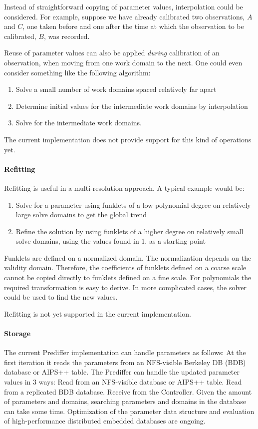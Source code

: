 \documentclass[10pt]{lofar}
\newcommand{\todo}[1]{\begin{center}\fbox{\parbox{0.9\textwidth}{\textbf{!!FIXME!! #1}}}\end{center}}
\begin{document}
Instead of straightforward copying of parameter values, interpolation could be
considered. For example, suppose we have already calibrated two observations,
$A$ and $C$, one taken before and one after the time at which the observation to
be calibrated, $B$, was recorded.

Reuse of parameter values can also be applied \emph{during} calibration of an
observation, when moving from one work domain to the next. One could even
consider something like the following algorithm:
\begin{enumerate}
\item Solve a small number of work domains spaced relatively far apart
\item Determine initial values for the intermediate work domains by
interpolation
\item Solve for the intermediate work domains.
\end{enumerate}

The current implementation does not provide support for this kind of operations
yet.

\paragraph{Refitting}
Refitting is useful in a multi-resolution approach. A typical example would be:
\begin{enumerate}
\item Solve for a parameter using funklets of a low polynomial degree on
relatively large solve domains to get the global trend
\item Refine the solution by using funklets of a higher degree on relatively
small solve domains, using the values found in 1. as a starting point
\end{enumerate}

Funklets are defined on a normalized domain. The normalization depends on the
validity domain. Therefore, the coefficients of funklets defined on a coarse
scale cannot be copied directly to funklets defined on a fine scale. For
polynomials the required transformation is easy to derive. In more complicated
cases, the solver could be used to find the new values.

Refitting is not yet supported in the current implementation.

\todo{Check of bovenstaande juist is.}

\paragraph{Storage}
The current Prediffer implementation can handle parameters as follows:
At the first iteration it reads the parameters from an NFS-visible Berkeley DB (BDB) database or AIPS++ table.
The Prediffer can handle the updated parameter values in 3 ways:
Read from an NFS-visible database or AIPS++ table.
Read from a replicated BDB database.
Receive from the Controller.
Given the amount of parameters and domains, searching parameters and domains in the database can take some time. Optimization of the parameter data structure and evaluation of high-performance distributed embedded databases are ongoing.
\end{document}
